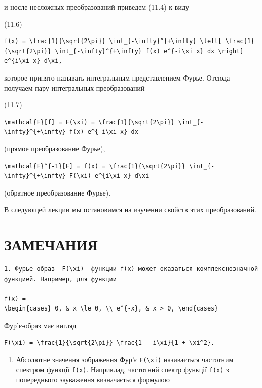 \documentclass[
  ukrainian,
]{article}
\providecommand{\tightlist}{%
  \setlength{\itemsep}{0pt}\setlength{\parskip}{0pt}}
\begin{document}
и носле несложных преобразований приведем (11.4) к виду

(11.6)

\begin{verbatim}
f(x) = \frac{1}{\sqrt{2\pi}} \int_{-\infty}^{+\infty} \left[ \frac{1}{\sqrt{2\pi}} \int_{-\infty}^{+\infty} f(x) e^{-i\xi x} dx \right] e^{i\xi x} d\xi,
\end{verbatim}

которое принято называть интегральным представлением Фурье. Отсюда
получаем пару интегральных преобразований

(11.7)

\begin{verbatim}
\mathcal{F}[f] = F(\xi) = \frac{1}{\sqrt{2\pi}} \int_{-\infty}^{+\infty} f(x) e^{-i\xi x} dx
\end{verbatim}

(прямое преобразование Фурье),

\begin{verbatim}
\mathcal{F}^{-1}[F] = f(x) = \frac{1}{\sqrt{2\pi}} \int_{-\infty}^{+\infty} F(\xi) e^{i\xi x} d\xi
\end{verbatim}

(обратное преобразование Фурье).

В следующей лекции мы остановимся на изучении свойств этих
преобразований.

\section{ЗАМЕЧАНИЯ}\label{ux437ux430ux43cux435ux447ux430ux43dux438ux44f}

\begin{verbatim}
1. Фурье-образ  F(\xi)  функции f(x) может оказаться комплекснозначной функцией. Например, для функции

f(x) =
\begin{cases} 0, & x \le 0, \\ e^{-x}, & x > 0, \end{cases}
\end{verbatim}

Фур'є-образ має вигляд

\begin{verbatim}
F(\xi) = \frac{1}{\sqrt{2\pi}} \frac{1 - i\xi}{1 + \xi^2}.
\end{verbatim}

\begin{enumerate}
\def\labelenumi{\arabic{enumi}.}
\setcounter{enumi}{1}
\tightlist
\item
  Абсолютне значення зображення Фур'є
  \texttt{\textbar{}F(\textbackslash{}xi)\textbar{}} називається
  частотним спектром функції \texttt{f(x)}. Наприклад, частотний спектр
  функції \texttt{f(x)} з попереднього зауваження визначається формулою
\end{enumerate}
\end{document}
